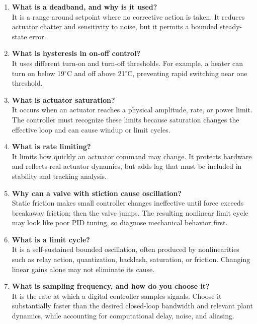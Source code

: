 \documentclass[11pt]{article}
\begin{document}
\begin{enumerate}
\item \textbf{What is a deadband, and why is it used?}\\
It is a range around setpoint where no corrective action is taken. It reduces actuator chatter and sensitivity to noise, but it permits a bounded steady-state error.

\item \textbf{What is hysteresis in on-off control?}\\
It uses different turn-on and turn-off thresholds. For example, a heater can turn on below 19$^\circ$C and off above 21$^\circ$C, preventing rapid switching near one threshold.

\item \textbf{What is actuator saturation?}\\
It occurs when an actuator reaches a physical amplitude, rate, or power limit. The controller must recognize these limits because saturation changes the effective loop and can cause windup or limit cycles.

\item \textbf{What is rate limiting?}\\
It limits how quickly an actuator command may change. It protects hardware and reflects real actuator dynamics, but adds lag that must be included in stability and tracking analysis.

\item \textbf{Why can a valve with stiction cause oscillation?}\\
Static friction makes small controller changes ineffective until force exceeds breakaway friction; then the valve jumps. The resulting nonlinear limit cycle may look like poor PID tuning, so diagnose mechanical behavior first.

\item \textbf{What is a limit cycle?}\\
It is a self-sustained bounded oscillation, often produced by nonlinearities such as relay action, quantization, backlash, saturation, or friction. Changing linear gains alone may not eliminate its cause.

\item \textbf{What is sampling frequency, and how do you choose it?}\\
It is the rate at which a digital controller samples signals. Choose it substantially faster than the desired closed-loop bandwidth and relevant plant dynamics, while accounting for computational delay, noise, and aliasing.


\end{enumerate}
\end{document}
